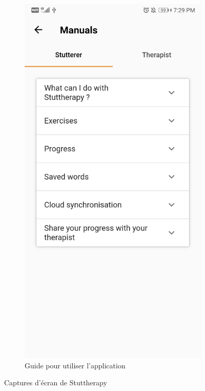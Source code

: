 \begin{appendices}
\begin{landscape}
\begin{figure}[h]
\begin{subfigure}{.25\textwidth}
    \includegraphics[width=.75\linewidth]{content/imgs/screen16.jpg}
    \caption{Guide pour utiliser l'application}
  \end{subfigure}


  \caption*{Captures d'écran de Stuttherapy}
\end{figure}

\end{landscape}




\end{appendices}
